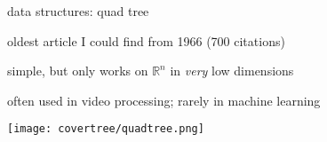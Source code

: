\begin{frame}[fragile]{data structures: quad tree}

oldest article I could find from 1966 (700 citations)

\vspace{0.25cm}
simple, but only works on $\mathbb{R}^n$ in \emph{very} low dimensions

\vspace{0.25cm}
often used in video processing; rarely in machine learning

\vspace{0.25cm}

\texttt{[image: covertree/quadtree.png]}
\end{frame}


